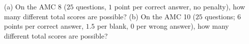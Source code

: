 (a) On the AMC 8 ($25$ questions, $1$ point per correct answer, no penalty), how many different total scores are possible? (b) On the AMC 10 ($25$ questions; $6$ points per correct answer, $1.5$ per blank, $0$ per wrong answer), how many different total scores are possible?
